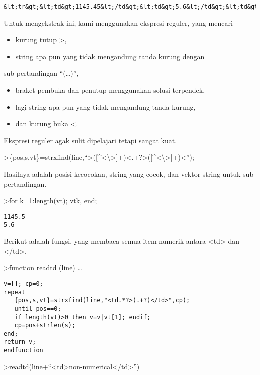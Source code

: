 \documentclass[
]{book}
\providecommand{\tightlist}{%
  \setlength{\itemsep}{0pt}\setlength{\parskip}{0pt}}
\begin{document}
\begin{verbatim}
&lt;tr&gt;&lt;td&gt;1145.45&lt;/td&gt;&lt;td&gt;5.6&lt;/td&gt;&lt;td&gt;-4.5&lt;/td&gt;&lt;tr&gt;
\end{verbatim}

Untuk mengekstrak ini, kami menggunakan ekspresi reguler, yang mencari

\begin{itemize}
\tightlist
\item
  kurung tutup \textgreater,\\
\item
  string apa pun yang tidak mengandung tanda kurung dengan
\end{itemize}

sub-pertandingan ``(\ldots)'',

\begin{itemize}
\item
  braket pembuka dan penutup menggunakan solusi terpendek,
\item
  lagi string apa pun yang tidak mengandung tanda kurung,
\item
  dan kurung buka \textless.
\end{itemize}

Ekspresi reguler agak sulit dipelajari tetapi sangat kuat.

\textgreater\{pos,s,vt\}=strxfind(line,``\textgreater({[}\^{}\textless\textbackslash\textgreater{]}+)\textless.+?\textgreater({[}\^{}\textless\textbackslash\textgreater{]}+)\textless{}'');

Hasilnya adalah posisi kecocokan, string yang cocok, dan vektor string untuk sub-pertandingan.

\textgreater for k=1:length(vt); vt\href{}{k}, end;

\begin{verbatim}
1145.5
5.6
\end{verbatim}

Berikut adalah fungsi, yang membaca semua item numerik antara \textless td\textgreater{} dan \textless/td\textgreater.

\textgreater function readtd (line) \ldots{}

\begin{verbatim}
v=[]; cp=0;
repeat
   {pos,s,vt}=strxfind(line,"<td.*?>(.+?)</td>",cp);
   until pos==0;
   if length(vt)>0 then v=v|vt[1]; endif;
   cp=pos+strlen(s);
end;
return v;
endfunction
\end{verbatim}

\textgreater readtd(line+``\textless td\textgreater non-numerical\textless/td\textgreater{}'')
\end{document}
